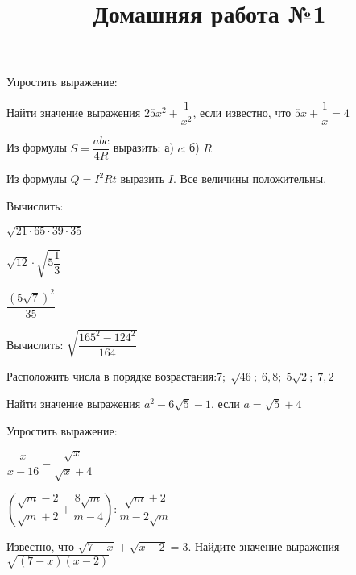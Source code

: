 \newpage
\title{Домашняя работа №1}
\begin{listofex}
	\item Упростить выражение:
\begin{enumcols}[itemcolumns=1]
	\item {}
	\item {}
\end{enumcols}

\item Найти значение выражения \( 25x^2+\dfrac{1}{x^2} \), если известно, что \( 5x+\dfrac{1}{x}=4 \)
\item Из формулы \( S=\dfrac{abc}{4R} \) выразить: а) \( c \); б) \( R \)
\item Из формулы \( Q=I^2Rt \) выразить \( I \). Все величины положительны.

\item Вычислить:
\begin{enumcols}[itemcolumns=3]
	\item \( \sqrt{21\cdot65\cdot39\cdot35} \)
	\item \( \sqrt{12}\cdot\sqrt{5\dfrac{1}{3}} \)
	\item \( \dfrac{(5\sqrt{7})^2}{35} \)
\end{enumcols}
\item Вычислить: \( \sqrt{\dfrac{165^2-124^2}{164}} \)
\item Расположить числа в порядке возрастания:\quad\( 7;\;\sqrt{46};\;6,8;\;5\sqrt{2};\;7,2 \)
\item Найти значение выражения \( a^2-6\sqrt{5}-1 \), если \( a=\sqrt{5}+4 \)

\item Упростить выражение:
\begin{enumcols}[itemcolumns=2]
	\item \( \dfrac{x}{x-16}-\dfrac{\sqrt{x}}{\sqrt{x}+4} \)
	\item \( \left( \dfrac{\sqrt{m}-2}{\sqrt{m}+2}+\dfrac{8\sqrt{m}}{m-4} \right):\dfrac{\sqrt{m}+2}{m-2\sqrt{m}} \)
\end{enumcols}
\item Известно, что \( \sqrt{7-x}+\sqrt{x-2}=3 \). Найдите значение выражения \( \sqrt{(7-x)(x-2)} \)
\end{listofex}
\newpage

